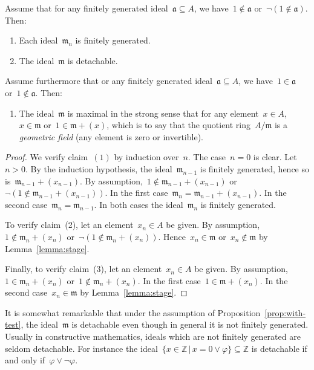 \documentclass[envcountsect,envcountsame,runningheads]{llncs}
\newcommand{\aaa}{\mathfrak{a}}
\newcommand{\mmm}{\mathfrak{m}}
\newcommand{\ZZ}{\mathbb{Z}}
\renewcommand{\_}{\mathpunct{.}\,}
\begin{document}
\begin{proposition}\label{prop:with-test}
Assume that for any finitely generated ideal~$\aaa \subseteq A$, we have~$1
\not\in \aaa$ or~$\neg(1 \not\in \aaa)$. Then:
\begin{enumerate}
\item Each ideal~$\mmm_n$ is finitely generated.
\item The ideal~$\mmm$ is detachable.
\end{enumerate}
Assume furthermore that or any finitely generated ideal~$\aaa \subseteq
A$, we have~$1 \in \aaa$ or~$1 \not\in \aaa$. Then:
\begin{enumerate}
\addtocounter{enumi}{2}
\item The ideal~$\mmm$ is maximal in the strong sense that for any element~$x
\in A$,~$x \in \mmm$ or~$1 \in \mmm + (x)$, which is to say that the quotient ring~$A/\mmm$ is a
\emph{geometric field} (any element is zero or invertible).
\end{enumerate}
\end{proposition}

\begin{proof}We verify claim~$(1)$ by induction over~$n$. The case~$n = 0$ is
clear. Let~$n > 0$. By the induction hypothesis, the ideal~$\mmm_{n-1}$ is finitely
generated, hence so is~$\mmm_{n-1} + (x_{n-1})$. By assumption,~$1 \not\in \mmm_{n-1} +
(x_{n-1})$ or~$\neg(1 \not\in \mmm_{n-1} + (x_{n-1}))$. In the first
case~$\mmm_n = \mmm_{n-1} + (x_{n-1})$. In the second case~$\mmm_n =
\mmm_{n-1}$. In both cases
the ideal~$\mmm_n$ is finitely generated.

To verify claim~(2), let an element~$x_n \in A$ be given. By assumption,~$1
\not\in \mmm_n + (x_n)$ or~$\neg(1 \not\in \mmm_n + (x_n))$. Hence~$x_n \in
\mmm$ or~$x_n \not\in \mmm$ by Lemma~\ref{lemma:stage}.

Finally, to verify claim~(3), let an element~$x_n \in A$ be given. By
assumption,~$1 \in \mmm_n + (x_n)$ or~$1 \not\in \mmm_n + (x_n)$. In the first
case~$1 \in \mmm + (x_n)$. In the second
case~$x_n \in \mmm$ by Lemma~\ref{lemma:stage}.
\end{proof}

It is somewhat remarkable that under the assumption of Proposition~\ref{prop:with-test}, the ideal~$\mmm$ is detachable even though in
general it is not finitely generated. Usually in constructive mathematics, ideals which are not
finitely generated are seldom detachable. For instance the ideal~$\{ x \in
\ZZ \,|\, x = 0 \vee \varphi \} \subseteq \ZZ$ is detachable if and only
if~$\varphi \vee \neg\varphi$.
\end{document}
